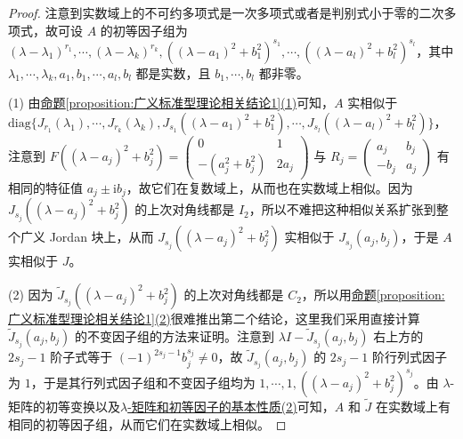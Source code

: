 \documentclass[../../main.tex]{subfiles}
\begin{document}
\begin{proof}
注意到实数域上的不可约多项式是一次多项式或者是判别式小于零的二次多项式，故可设 $A$ 的初等因子组为 $(\lambda - \lambda_1)^{r_1},\cdots,(\lambda - \lambda_k)^{r_k},((\lambda - a_1)^2 + b_1^2)^{s_1},\cdots,((\lambda - a_l)^2 + b_l^2)^{s_l}$，其中 $\lambda_1,\cdots,\lambda_k,a_1,b_1,\cdots,a_l,b_l$ 都是实数，且 $b_1,\cdots,b_l$ 都非零。

(1) 由\hyperref[proposition:广义标准型理论相关结论1]{命题\ref{proposition:广义标准型理论相关结论1}(1)}可知，$A$ 实相似于 $\mathrm{diag}\{J_{r_1}(\lambda_1),\cdots,J_{r_k}(\lambda_k),J_{s_1}((\lambda - a_1)^2 + b_1^2),\cdots,J_{s_l}((\lambda - a_l)^2 + b_l^2)\}$，注意到 $F((\lambda - a_j)^2 + b_j^2) = \begin{pmatrix}0 & 1 \\ -(a_j^2 + b_j^2) & 2a_j\end{pmatrix}$ 与 $R_j = \begin{pmatrix}a_j & b_j \\ -b_j & a_j\end{pmatrix}$ 有相同的特征值 $a_j\pm \mathrm{i}b_j$，故它们在复数域上，从而也在实数域上相似。因为 $J_{s_j}((\lambda - a_j)^2 + b_j^2)$ 的上次对角线都是 $I_2$，所以不难把这种相似关系扩张到整个广义 Jordan 块上，从而 $J_{s_j}((\lambda - a_j)^2 + b_j^2)$ 实相似于 $J_{s_j}(a_j,b_j)$，于是 $A$ 实相似于 $J$。

(2) 因为 $\widetilde{J}_{s_j}((\lambda - a_j)^2 + b_j^2)$ 的上次对角线都是 $C_2$，所以用\hyperref[proposition:广义标准型理论相关结论1]{命题\ref{proposition:广义标准型理论相关结论1}(2)}很难推出第二个结论，这里我们采用直接计算 $\widetilde{J}_{s_j}(a_j,b_j)$ 的不变因子组的方法来证明。注意到 $\lambda I - \widetilde{J}_{s_j}(a_j,b_j)$ 右上方的 $2s_j - 1$ 阶子式等于 $(-1)^{2s_j - 1}b_j^{s_j}\neq 0$，故 $\widetilde{J}_{s_j}(a_j,b_j)$ 的 $2s_j - 1$ 阶行列式因子为 $1$，于是其行列式因子组和不变因子组均为 $1,\cdots,1,((\lambda - a_j)^2 + b_j^2)^{s_j}$。由 $\lambda$-矩阵的初等变换以及\hyperref[theorem:lambda-矩阵和初等因子的基本性质]{$\lambda$-矩阵和初等因子的基本性质(2)}可知，$A$ 和 $\widetilde{J}$ 在实数域上有相同的初等因子组，从而它们在实数域上相似。
\end{proof}
\end{document}
